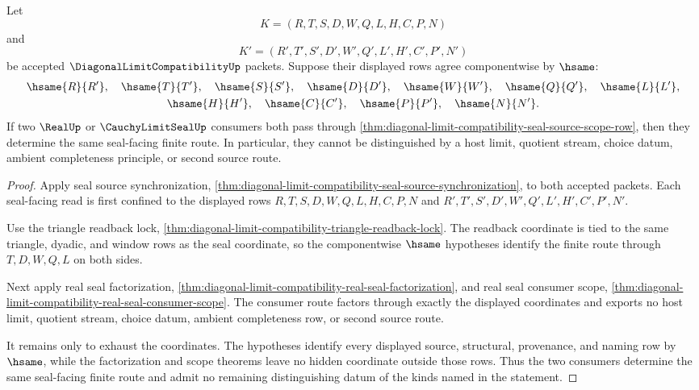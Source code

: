 \begin{theorem}
\label{thm:diagonal-limit-compatibility-seal-source-determinacy}
Let
$$
K=(R,T,S,D,W,Q,L,H,C,P,N)
$$
and
$$
K'=(R',T',S',D',W',Q',L',H',C',P',N')
$$
be accepted $\DiagonalLimitCompatibilityUp$ packets. Suppose their displayed
rows agree componentwise by $\hsame$:
$$
\begin{gathered}
\hsame{R}{R'},\quad \hsame{T}{T'},\quad \hsame{S}{S'},\quad
\hsame{D}{D'},\quad \hsame{W}{W'},\quad \hsame{Q}{Q'},\quad
\hsame{L}{L'},\\
\hsame{H}{H'},\quad \hsame{C}{C'},\quad \hsame{P}{P'},\quad
\hsame{N}{N'}.
\end{gathered}
$$
If two $\RealUp$ or $\CauchyLimitSealUp$ consumers both pass through
\autoref{thm:diagonal-limit-compatibility-seal-source-scope-row}, then they
determine the same seal-facing finite route. In particular, they cannot be
distinguished by a host limit, quotient stream, choice datum, ambient
completeness principle, or second source route.
\end{theorem}
\begin{proof}
Apply seal source synchronization,
\autoref{thm:diagonal-limit-compatibility-seal-source-synchronization}, to
both accepted packets. Each seal-facing read is first confined to the displayed
rows $R,T,S,D,W,Q,L,H,C,P,N$ and $R',T',S',D',W',Q',L',H',C',P',N'$.

Use the triangle readback lock,
\autoref{thm:diagonal-limit-compatibility-triangle-readback-lock}. The
readback coordinate is tied to the same triangle, dyadic, and window rows as
the seal coordinate, so the componentwise $\hsame$ hypotheses identify the
finite route through $T,D,W,Q,L$ on both sides.

Next apply real seal factorization,
\autoref{thm:diagonal-limit-compatibility-real-seal-factorization}, and real
seal consumer scope,
\autoref{thm:diagonal-limit-compatibility-real-seal-consumer-scope}. The
consumer route factors through exactly the displayed coordinates and exports no
host limit, quotient stream, choice datum, ambient completeness row, or second
source route.

It remains only to exhaust the coordinates. The hypotheses identify every
displayed source, structural, provenance, and naming row by $\hsame$, while the
factorization and scope theorems leave no hidden coordinate outside those rows.
Thus the two consumers determine the same seal-facing finite route and admit no
remaining distinguishing datum of the kinds named in the statement.
\end{proof}

